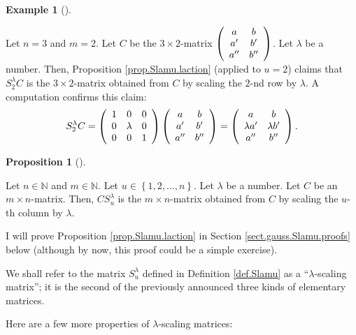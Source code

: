 \documentclass[numbers=enddot,12pt,final,onecolumn,notitlepage]{scrartcl}%
\theoremstyle{definition}
\newtheorem{prop}[theo]{Proposition}
\newenvironment{proposition}[1][]
{\begin{prop}[#1]\begin{leftbar}}
{\end{leftbar}\end{prop}}
\newtheorem{exam}[theo]{Example}
\newenvironment{example}[1][]
{\begin{exam}[#1]\begin{leftbar}}
{\end{leftbar}\end{exam}}
\begin{document}
\begin{example}
\label{exam.prop.Slamu.laction}Let $n=3$ and $m=2$. Let $C$ be the $3\times
2$-matrix $\left(
\begin{array}
[c]{cc}%
a & b\\
a^{\prime} & b^{\prime}\\
a^{\prime\prime} & b^{\prime\prime}%
\end{array}
\right)  $. Let $\lambda$ be a number. Then, Proposition
\ref{prop.Slamu.laction} (applied to $u=2$) claims that $S_{2}^{\lambda}C$ is
the $3\times2$-matrix obtained from $C$ by scaling the $2$-nd row by $\lambda
$. A computation confirms this claim:%
\[
S_{2}^{\lambda}C=\left(
\begin{array}
[c]{ccc}%
1 & 0 & 0\\
0 & \lambda & 0\\
0 & 0 & 1
\end{array}
\right)  \left(
\begin{array}
[c]{cc}%
a & b\\
a^{\prime} & b^{\prime}\\
a^{\prime\prime} & b^{\prime\prime}%
\end{array}
\right)  =\left(
\begin{array}
[c]{cc}%
a & b\\
\lambda a^{\prime} & \lambda b^{\prime}\\
a^{\prime\prime} & b^{\prime\prime}%
\end{array}
\right)  .
\]

\end{example}

\begin{proposition}
\label{prop.Slamu.raction}Let $n\in\mathbb{N}$ and $m\in\mathbb{N}$. Let
$u\in\left\{  1,2,\ldots,n\right\}  $. Let $\lambda$ be a number. Let $C$ be
an $m\times n$-matrix. Then, $CS_{u}^{\lambda}$ is the $m\times n$-matrix
obtained from $C$ by scaling the $u$-th column by $\lambda$.
\end{proposition}

I will prove Proposition \ref{prop.Slamu.laction} in Section
\ref{sect.gauss.Slamu.proofs} below (although by now, this proof could be a
simple exercise).

We shall refer to the matrix $S_{u}^{\lambda}$ defined in Definition
\ref{def.Slamu} as a \textquotedblleft$\lambda$-scaling
matrix\textquotedblright; it is the second of the previously announced three
kinds of elementary matrices.

Here are a few more properties of $\lambda$-scaling matrices:
\end{document}
